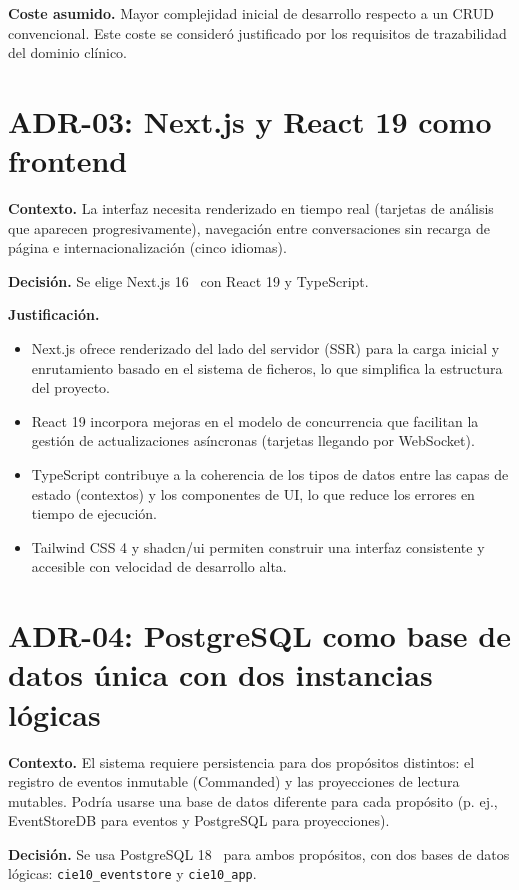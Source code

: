 \textbf{Coste asumido.} Mayor complejidad inicial de desarrollo respecto a un CRUD convencional. Este coste se consideró justificado por los requisitos de trazabilidad del dominio clínico.

\section{ADR-03: Next.js y React 19 como frontend}

\textbf{Contexto.} La interfaz necesita renderizado en tiempo real (tarjetas de análisis que aparecen progresivamente), navegación entre conversaciones sin recarga de página e internacionalización (cinco idiomas).

\textbf{Decisión.} Se elige Next.js 16~\cite{nextjs2024} con React 19 y TypeScript.

\textbf{Justificación.}
\begin{itemize}
    \item Next.js ofrece renderizado del lado del servidor (SSR) para la carga inicial y enrutamiento basado en el sistema de ficheros, lo que simplifica la estructura del proyecto.
    \item React 19 incorpora mejoras en el modelo de concurrencia que facilitan la gestión de actualizaciones asíncronas (tarjetas llegando por WebSocket).
    \item TypeScript contribuye a la coherencia de los tipos de datos entre las capas de estado (contextos) y los componentes de UI, lo que reduce los errores en tiempo de ejecución.
    \item Tailwind CSS 4 y shadcn/ui permiten construir una interfaz consistente y accesible con velocidad de desarrollo alta.
\end{itemize}

\section{ADR-04: PostgreSQL como base de datos única con dos instancias lógicas}

\textbf{Contexto.} El sistema requiere persistencia para dos propósitos distintos: el registro de eventos inmutable (Commanded) y las proyecciones de lectura mutables. Podría usarse una base de datos diferente para cada propósito (p. ej., EventStoreDB para eventos y PostgreSQL para proyecciones).

\textbf{Decisión.} Se usa PostgreSQL 18~\cite{postgresql2024} para ambos propósitos, con dos bases de datos lógicas: \texttt{cie10\_eventstore} y \texttt{cie10\_app}.

